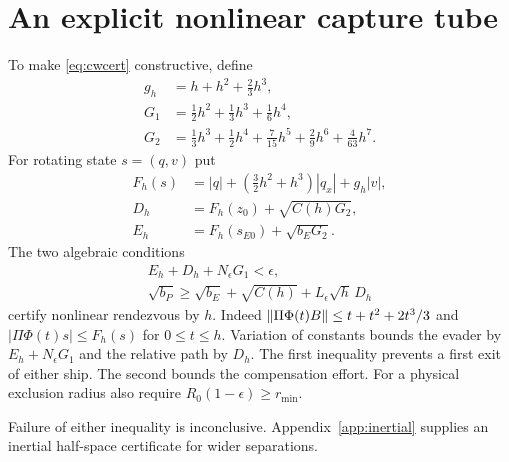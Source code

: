\section{An explicit nonlinear capture tube}
\label{app:tube}
To make \eqref{eq:cwcert} constructive, define
\begin{equation}
 \begin{split}
 g_h&=h+h^2+\tfrac23h^3,\\
 G_1&=\tfrac12h^2+\tfrac13h^3+\tfrac16h^4,\\
 G_2&=\tfrac13h^3+\tfrac12h^4+\tfrac7{15}h^5
                     +\tfrac29h^6+\tfrac4{63}h^7.
 \end{split}
\end{equation}
For rotating state $s=(q,v)$ put
\begin{equation}
 \begin{split}
 F_h(s)&=|q|+(\tfrac32h^2+h^3)|q_x|+g_h|v|,\\
 D_h&=F_h(z_0)+\sqrt{C(h)G_2},\\
 E_h&=F_h(s_{E0})+\sqrt{b_EG_2}.
 \end{split}
\end{equation}
The two algebraic conditions
\begin{equation}
 \begin{gathered}
 E_h+D_h+N_\epsilon G_1<\epsilon,\\
 \sqrt{b_P}\ge\sqrt{b_E}+\sqrt{C(h)}
                      +L_\epsilon\sqrt h\,D_h
 \end{gathered}
\end{equation}
certify nonlinear rendezvous by $h$.
Indeed $\lVert\Pi\Phi(t)B\rVert\le t+t^2+2t^3/3$ and
$|\Pi\Phi(t)s|\le F_h(s)$ for $0\le t\le h$.
Variation of constants bounds the evader by
$E_h+N_\epsilon G_1$ and the relative path by $D_h$.
The first inequality prevents a first exit of either ship.
The second bounds the compensation effort.
For a physical exclusion radius also require
$R_0(1-\epsilon)\ge r_{\min}$.

Failure of either inequality is inconclusive.
Appendix~\ref{app:inertial} supplies an inertial half-space certificate for wider separations.

